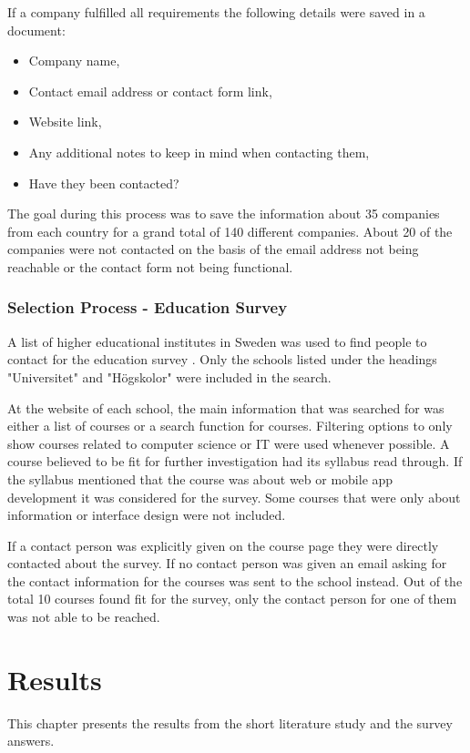\documentclass[a4paper,12pt]{article}
\begin{document}
If a company fulfilled all requirements the following details were saved in a document:

\begin{itemize}
    \item Company name,
    \item Contact email address or contact form link,
    \item Website link,
    \item Any additional notes to keep in mind when contacting them,
    \item Have they been contacted?
\end{itemize}

The goal during this process was to save the information about 35 companies from each country for a grand total of 140 different companies. About 20 of the companies were not contacted on the basis of the email address not being reachable or the contact form not being functional.

\subsubsection{Selection Process - Education Survey}
\label{Project_participantSelection_processEdu}
A list of higher educational institutes in Sweden was used to find people to contact for the education survey \cite{higher_edu_sweden}. Only the schools listed under the headings "Universitet" and "Högskolor" were included in the search.

At the website of each school, the main information that was searched for was either a list of courses or a search function for courses. Filtering options to only show courses related to computer science or IT were used whenever possible. A course believed to be fit for further investigation had its syllabus read through. If the syllabus mentioned that the course was about web or mobile app development it was considered for the survey. Some courses that were only about information or interface design were not included.

If a contact person was explicitly given on the course page they were directly contacted about the survey. If no contact person was given an email asking for the contact information for the courses was sent to the school instead. Out of the total 10 courses found fit for the survey, only the contact person for one of them was not able to be reached.


\newpage
\section{Results}
\label{Results}
This chapter presents the results from the short literature study and the survey answers.
\end{document}
